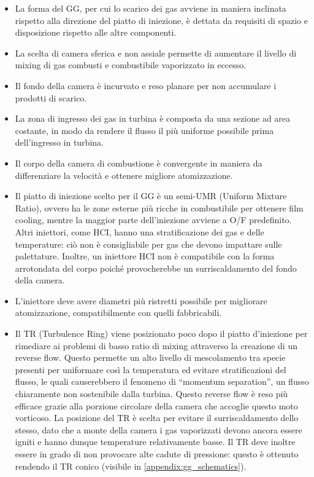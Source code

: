 \begin{itemize}[wide,itemsep=3pt,topsep=3pt]

\item
La forma del GG, per cui lo scarico dei gas avviene in maniera inclinata rispetto alla direzione del piatto di iniezione, è dettata da requisiti di spazio e disposizione rispetto alle altre componenti.

\item
La scelta di camera sferica e non assiale permette di aumentare il livello di mixing di gas combusti e combustibile vaporizzato in eccesso.

\item
Il fondo della camera è incurvato e reso planare per non accumulare i prodotti di scarico.

\item
La zona di ingresso dei gas in turbina è composta da una sezione ad area costante, in modo da rendere il flusso il più uniforme possibile prima dell'ingresso in turbina.

\item
Il corpo della camera di combustione è convergente in maniera da differenziare la velocità e ottenere migliore atomizzazione.

\item
Il piatto di iniezione scelto per il GG è un semi-UMR (Uniform Mixture Ratio), ovvero ha le zone esterne più ricche in combustibile per ottenere film cooling, mentre la maggior parte dell’iniezione avviene a O/F predefinito.
Altri iniettori, come HCI, hanno una stratificazione dei gas e delle temperature: ciò non è consigliabile per gas che devono impattare sulle palettature. Inoltre, un iniettore HCI non è compatibile con la forma arrotondata del corpo poiché provocherebbe un surriscaldamento del fondo della camera.

\item
L’iniettore deve avere diametri più ristretti possibile per migliorare atomizzazione, compatibilmente con quelli fabbricabili.

\item
Il TR (Turbulence Ring) viene posizionato poco dopo il piatto d'iniezione per rimediare ai problemi di basso ratio di mixing attraverso la creazione di un reverse flow.
Questo permette un alto livello di mescolamento tra specie presenti per uniformare così la temperatura ed evitare stratificazioni del flusso, le quali causerebbero il fenomeno di “momentum separation”, un flusso chiaramente non sostenibile dalla turbina.
Questo reverse flow è reso più efficace grazie alla porzione circolare della camera che accoglie questo moto vorticoso.
La posizione del TR è scelta per evitare il surriscaldamento dello stesso, dato che a monte della camera i gas vaporizzati devono ancora essere igniti e hanno dunque temperature relativamente basse.
Il TR deve inoltre essere in grado di non provocare alte cadute di pressione: questo è ottenuto rendendo il TR conico (visibile in \autoref{appendix:gg_schematics}).


\end{itemize}
